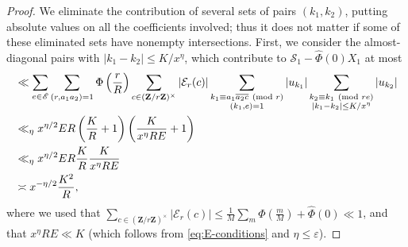 \documentclass[reqno,11pt]{amsart}
\theoremstyle{definition}
\theoremstyle{remark}
\numberwithin{equation}{section}
\newcommand{\Z}{\mathbf{Z}}
\newcommand{\msE}{\mathscr{E}}
\newcommand{\mE}{\mathcal{E}}
\newcommand{\mS}{\mathcal{S}}
\newcommand{\eps}{\varepsilon}
\renewcommand{\bar}{\overline}
\renewcommand{\hat}{\widehat}
\renewcommand{\pmod}[1]{\ (\textnormal{mod } #1)}
\begin{document}
\begin{proof}
We eliminate the contribution of several sets of pairs $(k_1, k_2)$, putting absolute values on all the coefficients involved; thus it does not matter if some of these eliminated sets have nonempty intersections.
First, we consider the almost-diagonal pairs with $|k_1 - k_2| \le K/x^\eta$, which contribute to $\mS_1 - \hat{\Phi}(0)X_1$ at most
\[
\begin{aligned}
    &\ll \sum_{e \in \msE} \sum_{(r,a_1a_2)=1} \Phi\left(\frac{r}{R}\right) \sum_{c \in (\Z/r\Z)^\times} |\mE_r(c)| \sum_{\substack{k_1 \equiv a_1 \bar{a_2c} \pmod{r} \\ (k_1, e) = 1}} |u_{k_1}| \sum_{\substack{k_2 \equiv k_1 \pmod{re} \\ |k_1 - k_2| \le K/x^\eta}}  |u_{k_2}|
    \\
    &\ll_\eta x^{\eta/2} E R \left(\frac{K}{R} + 1\right) \left(\frac{K}{x^\eta RE} + 1\right)
    \\
    &\ll_\eta x^{\eta/2}ER \frac{K}{R} \frac{K}{x^\eta RE}
    \\
    &\asymp 
    x^{-\eta/2} \frac{K^2}{R},
\end{aligned}
\]
where we used that $\sum_{c \in (\Z/r\Z)^\times} |\mE_r(c)| \le \frac{1}{M} \sum_m \Phi\left(\frac{m}{M}\right) + \hat{\Phi}(0) \ll 1$, and that $x^{\eta} RE \ll K$ (which follows from \cref{eq:E-conditions} and $\eta \le \eps$).


\end{proof}
\end{document}
